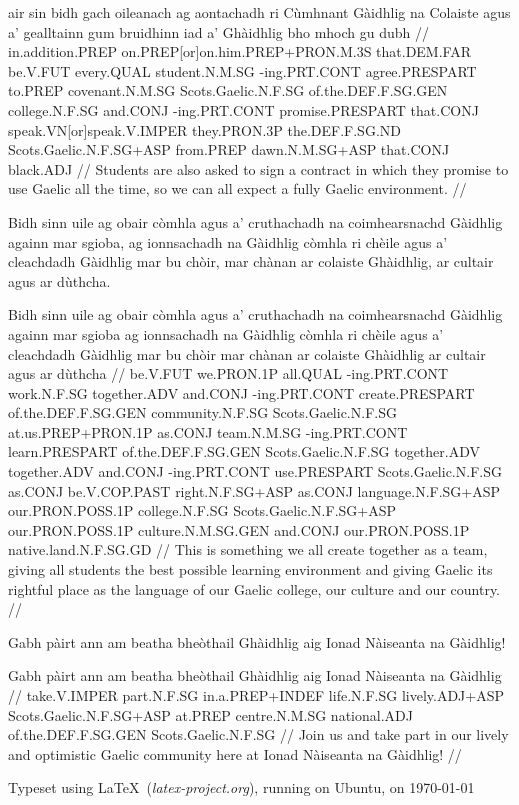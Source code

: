 \documentclass[a4paper,10pt]{article}
\begin{document}
\vspace{4mm}
 air sin bidh gach oileanach ag aontachadh ri Cùmhnant Gàidhlig na Colaiste agus a' gealltainn gum bruidhinn iad a' Ghàidhlig bho mhoch gu dubh  //
\glb in.addition.PREP on.PREP[or]on.him.PREP+PRON.M.3S that.DEM.FAR be.V.FUT every.QUAL student.N.M.SG -ing.PRT.CONT agree.PRESPART to.PREP covenant.N.M.SG Scots.Gaelic.N.F.SG of.the.DEF.F.SG.GEN college.N.F.SG and.CONJ -ing.PRT.CONT promise.PRESPART that.CONJ speak.VN[or]speak.V.IMPER they.PRON.3P the.DEF.F.SG.ND Scots.Gaelic.N.F.SG+ASP from.PREP dawn.N.M.SG+ASP that.CONJ black.ADJ  //
\glft Students are also asked to sign a contract in which they promise to use Gaelic all the time, so we can all expect a fully Gaelic environment. //
\endgl
\xe

\ex
\begingl
\glpre Bidh sinn uile ag obair còmhla agus a' cruthachadh na coimhearsnachd Gàidhlig againn mar sgioba, ag ionnsachadh na Gàidhlig còmhla ri chèile agus a' cleachdadh Gàidhlig mar bu chòir, mar chànan ar colaiste Ghàidhlig, ar cultair agus ar dùthcha. 

\vspace{4mm}
\gla Bidh sinn uile ag obair còmhla agus a' cruthachadh na coimhearsnachd Gàidhlig againn mar sgioba ag ionnsachadh na Gàidhlig còmhla {ri chèile} agus a' cleachdadh Gàidhlig mar bu chòir mar chànan ar colaiste Ghàidhlig ar cultair agus ar dùthcha  //
\glb be.V.FUT we.PRON.1P all.QUAL -ing.PRT.CONT work.N.F.SG together.ADV and.CONJ -ing.PRT.CONT create.PRESPART of.the.DEF.F.SG.GEN community.N.F.SG Scots.Gaelic.N.F.SG at.us.PREP+PRON.1P as.CONJ team.N.M.SG -ing.PRT.CONT learn.PRESPART of.the.DEF.F.SG.GEN Scots.Gaelic.N.F.SG together.ADV together.ADV and.CONJ -ing.PRT.CONT use.PRESPART Scots.Gaelic.N.F.SG as.CONJ be.V.COP.PAST right.N.F.SG+ASP as.CONJ language.N.F.SG+ASP our.PRON.POSS.1P college.N.F.SG Scots.Gaelic.N.F.SG+ASP our.PRON.POSS.1P culture.N.M.SG.GEN and.CONJ our.PRON.POSS.1P native.land.N.F.SG.GD  //
\glft This is something we all create together as a team, giving all students the best possible learning environment and giving Gaelic its rightful place as the language of our Gaelic college, our culture and our country. //
\endgl
\xe

\ex
\begingl
\glpre Gabh pàirt ann am beatha bheòthail Ghàidhlig aig Ionad Nàiseanta na Gàidhlig! 

\vspace{4mm}
\gla Gabh pàirt {ann am} beatha bheòthail Ghàidhlig aig Ionad Nàiseanta na Gàidhlig  //
\glb take.V.IMPER part.N.F.SG in.a.PREP+INDEF life.N.F.SG lively.ADJ+ASP Scots.Gaelic.N.F.SG+ASP at.PREP centre.N.M.SG national.ADJ of.the.DEF.F.SG.GEN Scots.Gaelic.N.F.SG  //
\glft Join us and take part in our lively and optimistic Gaelic community here at Ionad Nàiseanta na Gàidhlig! //
\endgl
\xe


\vfill

\begin{flushright}
Typeset using \LaTeX\ (\textit{latex-project.org}), running on Ubuntu, on \longdate\today
\end{flushright}
\end{document}
